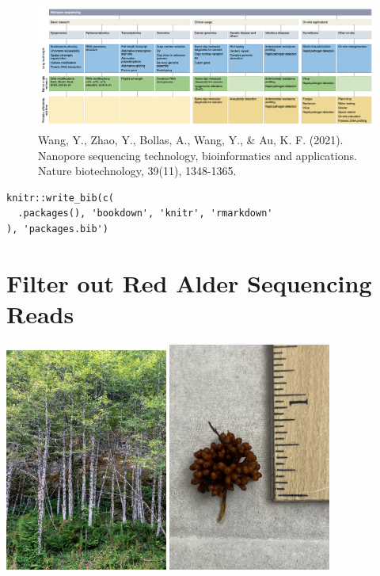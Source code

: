 \documentclass[
]{book}
\begin{document}
\begin{figure}
\centering
\includegraphics[width=1\textwidth,height=\textheight]{./Figures/Nanopore2.png}
\caption{Wang, Y., Zhao, Y., Bollas, A., Wang, Y., \& Au, K. F. (2021). Nanopore sequencing technology, bioinformatics and applications. Nature biotechnology, 39(11), 1348-1365.}
\end{figure}

\begin{verbatim}
knitr::write_bib(c(
  .packages(), 'bookdown', 'knitr', 'rmarkdown'
), 'packages.bib')
\end{verbatim}

\hypertarget{filter-out-red-alder-sequencing-reads}{%
\chapter{Filter out Red Alder Sequencing Reads}\label{filter-out-red-alder-sequencing-reads}}

\includegraphics[width=0.4\textwidth,height=\textheight]{Figures/AlderTree.png}
\includegraphics[width=0.4\textwidth,height=\textheight]{Figures/AlderNodule.png}
\end{document}
